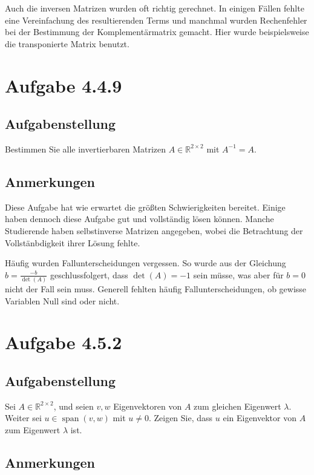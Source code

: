\documentclass[a4paper]{article}
\newcommand*{\R}{\mathbb R}
\begin{document}
Auch die inversen Matrizen wurden oft richtig gerechnet. In einigen Fällen fehlte eine Vereinfachung des resultierenden Terms und manchmal wurden Rechenfehler bei der Bestimmung der Komplementärmatrix gemacht. Hier wurde beispielsweise die transponierte Matrix benutzt.

\section{Aufgabe 4.4.9}

\subsection{Aufgabenstellung}

Bestimmen Sie alle invertierbaren Matrizen $A\in\R^{2\times 2}$ mit $A^{-1} = A$.

\subsection{Anmerkungen}

Diese Aufgabe hat wie erwartet die größten Schwierigkeiten bereitet. Einige haben dennoch diese Aufgabe gut und vollständig lösen können. Manche Studierende haben selbstinverse Matrizen angegeben, wobei die Betrachtung der Vollstänbdigkeit ihrer Lösung fehlte.

Häufig wurden Fallunterscheidungen vergessen. So wurde aus der Gleichung $b=\frac{-b}{\operatorname{det}(A)}$ geschlussfolgert, dass $\operatorname{det}(A)=-1$ sein müsse, was aber für $b=0$ nicht der Fall sein muss. Generell fehlten häufig Fallunterscheidungen, ob gewisse Variablen Null sind oder nicht.

\section{Aufgabe 4.5.2}

\subsection{Aufgabenstellung}

Sei $A\in\R^{2\times 2}$, und seien $v,w$ Eigenvektoren von $A$ zum gleichen Eigenwert $\lambda$. Weiter sei $u\in\operatorname{span}(v,w)$ mit $u\neq 0$. Zeigen Sie, dass $u$ ein Eigenvektor von $A$ zum Eigenwert $\lambda$ ist.

\subsection{Anmerkungen}
\end{document}
